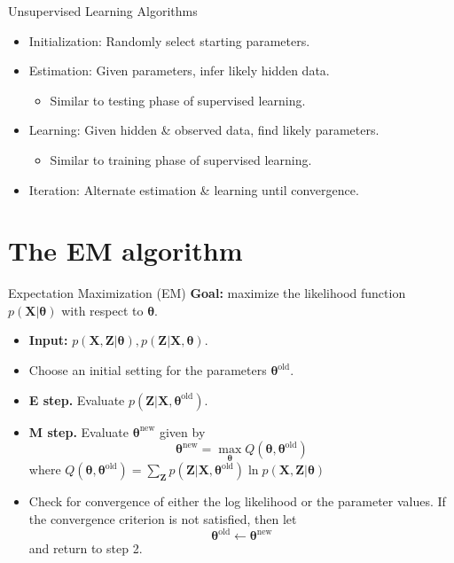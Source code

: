 \documentclass[10pt,mathserif]{beamer}
\begin{document}
\begin{frame}{Unsupervised Learning Algorithms }
\begin{itemize}
\item Initialization: Randomly select starting parameters.
\item Estimation: Given parameters, infer likely hidden data.
    \begin{itemize}
        \item Similar to testing phase of supervised learning.
    \end{itemize}
\item Learning: Given hidden \& observed data, find likely parameters.
    \begin{itemize}
        \item Similar to training phase of supervised learning.
    \end{itemize}
\item Iteration: Alternate estimation \& learning until convergence.
\end{itemize}
\end{frame}

\section{The EM algorithm}
\begin{frame}{Expectation Maximization (EM)}
\textbf{Goal:} maximize the likelihood function $p(\bm{X}|\bm{\theta})$ with respect to $\bm{\theta}$. 
\begin{itemize}
    \item \textbf{Input:} $p(\bm{X}, \bm{Z}|\bm{\theta}), p(\bm{Z}|\bm{X},\bm{\theta})$.
    \item Choose an initial setting for the parameters $\bm{\theta}^{\text{old}}$.
    \item \textbf{E step.} Evaluate $p(\bm{Z}|\bm{X}, \bm{\theta}^{\text{old}})$.
    \item \textbf{M step.} Evaluate $\bm{\theta}^{\text{new}}$ given by 
        \begin{equation*}
            \bm{\theta}^{\text{new}} = \max_{\bm{\theta}}Q(\bm{\theta}, \bm{\theta}^{\text{old}})
        \end{equation*}
    where $Q(\bm{\theta}, \bm{\theta}^{\text{old}}) = \sum_{\bm{Z}} p(\bm{Z}|\bm{X},\bm{\theta}^{\text{old}}) \ln p(\bm{X},\bm{Z}|\bm{\theta})$
    \item Check for convergence of either the log likelihood or the parameter values. If the convergence criterion is not satisfied, then let
    \begin{equation*}
        \bm{\theta}^{\text{old}} \leftarrow  \bm{\theta}^{\text{new}}
    \end{equation*}
    and return to step 2.
\end{itemize}
\end{frame}
\end{document}
